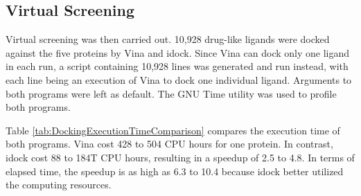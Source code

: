 \subsection{Virtual Screening}

Virtual screening was then carried out. 10,928 drug-like ligands were docked against the five proteins by Vina and idock. Since Vina can dock only one ligand in each run, a script containing 10,928 lines was generated and run instead, with each line being an execution of Vina to dock one individual ligand. Arguments to both programs were left as default. The GNU Time utility was used to profile both programs.

Table \ref{tab:DockingExecutionTimeComparison} compares the execution time of both programs. Vina cost 428 to 504 CPU hours for one protein. In contrast, idock cost 88 to 184T CPU hours, resulting in a speedup of 2.5 to 4.8. In terms of elapsed time, the speedup is as high as 6.3 to 10.4 because idock better utilized the computing resources.

